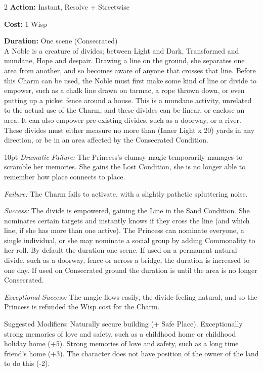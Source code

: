 \begin{multicols}{2}
\noindent \textbf{Action:} Instant, Resolve + Streetwise

\noindent \textbf{Cost:} 1 Wisp

\noindent \textbf{Duration:} One scene (Consecrated)\\

\noindent A Noble is a creature of divides; between Light and Dark, Transformed and mundane, Hope and despair. Drawing a line on the ground, she separates one area from another, and so becomes aware of anyone that crosses that line. Before this Charm can be used, the Noble must first make some kind of line or divide to empower, such as a chalk line drawn on tarmac, a rope thrown down, or even putting up a picket fence around a house. This is a mundane activity, unrelated to the actual use of the Charm, and these divides can be linear, or enclose an area. It can also empower pre-existing divides, such as a doorway, or a river. These divides must either measure no more than (Inner Light x 20) yards in any direction, or be in an area affected by the Consecrated Condition.

\begin{myindentpar}{10pt}    \emph{Dramatic Failure:} The Princess's clumsy magic temporarily manages to scramble her memories. She gains the Lost Condition, she is no longer able to remember how place connects to place. 

    \emph{Failure:} The Charm fails to activate, with a slightly pathetic spluttering noise.

    \emph{Success:} The divide is empowered, gaining the Line in the Sand Condition. She nominates certain targets and instantly knows if they cross the line (and which line, if she has more than one active). The Princess can nominate everyone, a single individual, or she may nominate a social group by adding Commonality to her roll. By default the duration one scene. If used on a permanent natural divide, such as a doorway, fence or across a bridge, the duration is increased to one day. If used on Consecrated ground the duration is until the area is no longer Consecrated.

    \emph{Exceptional Success:} The magic flows easily, the divide feeling natural, and so the Princess is refunded the Wisp cost for the Charm.

    Suggested Modifiers: Naturally secure building (+ Safe Place). Exceptionally strong memories of love and safety, such as a childhood home or childhood holiday home (+5). Strong memories of love and safety, such as a long time friend's home (+3). The character does not have position of the owner of the land to do this (-2).


\end{myindentpar}
\end{multicols}
